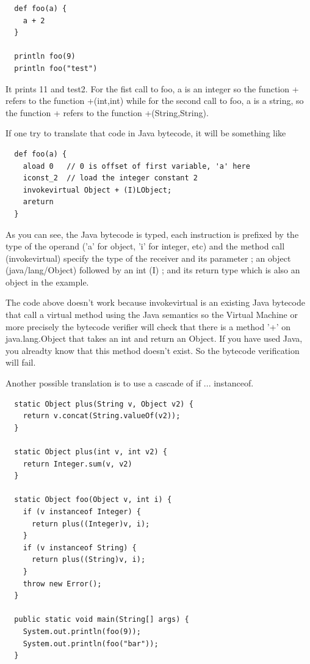 \documentclass{sigplanconf}
\begin{document}
      {\tiny      
      \begin{verbatim}
  def foo(a) {
    a + 2
  }

  println foo(9)
  println foo("test")
      \end{verbatim}
      }

      It prints 11 and test2. For the fist call to foo, a is an integer so the function + refers
      to the function +(int,int) while for the second call to foo, a is a string, so the
      function + refers to the function +(String,String).

      If one try to translate that code in Java bytecode, it will be something like
      {\tiny      
      \begin{verbatim}
  def foo(a) {
    aload 0   // 0 is offset of first variable, 'a' here
    iconst_2  // load the integer constant 2
    invokevirtual Object + (I)LObject;
    areturn 
  }
      \end{verbatim}
      }

      As you can see, the Java bytecode is typed, each instruction is prefixed 
      by the type of the operand ('a' for object, 'i' for integer, etc)
      and the method call (invokevirtual) specify the type of the receiver and its parameter ;
      an object (java/lang/Object) followed by an int (I) ; and its return type
      which is also an object in the example.

      The code above doesn't work because invokevirtual is an existing Java bytecode that call
      a virtual method using the Java semantics so the Virtual Machine or more precisely
      the bytecode verifier will check that there is a method '+' on java.lang.Object
      that takes an int and return an Object. If you have used Java, you alreadty know
      that this method doesn't exist. So the bytecode verification will fail. 

      Another possible translation is to use a cascade of if ... instanceof.
      {\tiny      
      \begin{verbatim}
  static Object plus(String v, Object v2) {
    return v.concat(String.valueOf(v2));
  }

  static Object plus(int v, int v2) {
    return Integer.sum(v, v2)
  }

  static Object foo(Object v, int i) {
    if (v instanceof Integer) {
      return plus((Integer)v, i);
    }
    if (v instanceof String) {
      return plus((String)v, i);
    }
    throw new Error();
  }

  public static void main(String[] args) {
    System.out.println(foo(9));
    System.out.println(foo("bar"));
  }
      \end{verbatim}
      }
\end{document}

